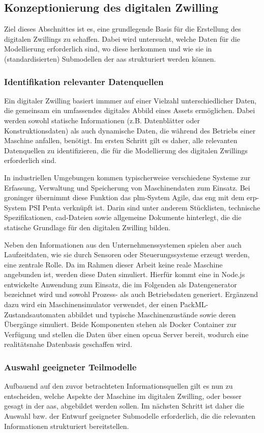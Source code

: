 \subsection{Konzeptionierung des digitalen Zwilling}
Ziel dieses Abschnittes ist es, eine grundlegende Basis für die Erstellung des digitalen Zwillings zu schaffen.
Dabei wird untersucht, welche Daten für die Modellierung erforderlich sind, wo diese herkommen und wie sie in (standardisierten) Submodellen der \acs{aas} strukturiert werden können.
\subsubsection{Identifikation relevanter Datenquellen}
Ein digitaler Zwilling basiert immmer auf einer Vielzahl unterschiedlicher Daten, die gemeinsam ein umfassendes digitales Abbild eines Assets ermöglichen. 
Dabei werden sowohl statische Informationen (z.B. Datenblätter oder Konstruktionsdaten) als auch dynamische Daten, die während des Betriebs einer Maschine anfallen, benötigt.
Im ersten Schritt gilt es daher, alle relevanten Datenquellen zu identifizieren, die für die Modellierung des digitalen Zwillings erforderlich sind.

In industriellen Umgebungen kommen typischerweise verschiedene Systeme zur Erfassung, Verwaltung und Speicherung von Maschinendaten zum Einsatz.
Bei groninger übernimmt diese Funktion das \acs{plm}-System Agile, das eng mit dem \acs{erp}-System PSI Penta verknüpft ist.
Darin sind unter anderem Stücklisten, technische Spezifikationen, \acs{cad}-Dateien sowie allgemeine Dokumente hinterlegt, die die statische Grundlage  für den digitalen Zwilling bilden.

Neben den Informationen aus den Unternehmenssystemen spielen aber auch Laufzeitdaten, wie sie durch Sensoren oder Steuerungssysteme erzeugt werden, eine zentrale Rolle.
Da im Rahmen dieser Arbeit keine reale Maschine angebunden ist, werden diese Daten simuliert.
Hierfür kommt eine in Node.js entwickelte Anwendung zum Einsatz, die im Folgenden als Datengenerator bezeichnet wird und sowohl Prozess- als auch Betriebsdaten generiert. 
Ergänzend dazu wird ein Maschinensimulator verwendet, der einen PackML-Zustandsautomaten abbildet und typische Maschinenzustände sowie deren Übergänge simuliert. 
Beide Komponenten stehen als Docker Container zur Verfügung und stellen die Daten über einen \acs{opcua} Server bereit, wodurch eine realitätsnahe Datenbasis geschaffen wird.
\subsubsection{Auswahl geeigneter Teilmodelle}
Aufbauend auf den zuvor betrachteten Informationsquellen gilt es nun zu entscheiden, welche Aspekte der Maschine im digitalen Zwilling, oder besser gesagt in der \acs{aas}, abgebildet werden sollen.
Im nächsten Schritt ist daher die Auswahl bzw. der Entwurf geeigneter Submodelle erforderlich, die die relevanten Informationen strukturiert bereitstellen.

